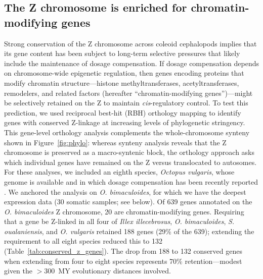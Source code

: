 \documentclass[12pt]{article}
\newcommand{\citep}{\parencite}
\newcommand{\illex}{\textit{Illex illecebrosus}\xspace}
\begin{document}
\subsection*{The Z chromosome is enriched for chromatin-modifying genes}
Strong conservation of the Z chromosome across coleoid cephalopods implies
that its gene content has been subject to long-term selective pressures that
likely include the maintenance of dosage compensation.
If dosage compensation depends on chromosome-wide epigenetic regulation,
then genes encoding proteins that modify chromatin structure---histone
methyltransferases, acetyltransferases, remodelers, and related
factors (hereafter ``chromatin-modifying genes'')---might be selectively
retained on the Z to maintain \textit{cis}-regulatory control.
To test this prediction, we used reciprocal best-hit (RBH) orthology mapping
to identify genes with conserved Z-linkage
at increasing levels of phylogenetic stringency.
This gene-level orthology analysis complements the whole-chromosome
synteny shown in Figure~\ref{fig:phylo}: whereas synteny analysis reveals
that the Z chromosome is preserved as a macro-syntenic block,
the orthology approach asks which individual genes have remained on the Z
versus translocated to autosomes.
For these analyses, we included an eighth species,
\textit{Octopus vulgaris}, whose genome is available
and in which dosage compensation has been recently reported \citep{papanicolaou2024z}.
We anchored the analysis on \textit{O. bimaculoides}, for which we have the
deepest expression data (30 somatic samples; see below).
Of 639 genes annotated on the \textit{O. bimaculoides} Z chromosome,
20 are chromatin-modifying genes.
Requiring that a gene be Z-linked in all four of
\illex, \textit{O. bimaculoides}, \textit{S. oualaniensis}, and \textit{O. vulgaris}
retained 188 genes (29\% of the 639);
extending the requirement to all eight species reduced this to 132
(Table~\ref{tab:conserved_z_genes}).
The drop from 188 to 132 conserved genes when extending from four
to eight species represents 70\% retention---modest given the
$>$300~MY evolutionary distances involved.
\end{document}
